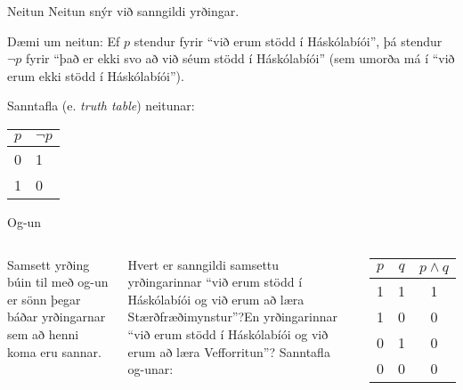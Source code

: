 \documentclass{beamer}
\begin{document}
\begin{frame}{Neitun}
Neitun snýr við sanngildi yrðingar.
\vspace{0.5cm}

Dæmi um neitun: Ef $p$ stendur fyrir ``við erum stödd í Háskólabíói'', þá stendur $\lnot p$ fyrir\pause{} ``það er ekki svo að við séum stödd í Háskólabíói'' (sem umorða má í ``við erum ekki stödd í Háskólabíói'').

\vspace*{0.5cm}
Sanntafla (e. \emph{truth table}) neitunar:

\begin{center}
\begin{tabular}{ll}
\toprule
$p$&$\lnot p$\\
\midrule
0&1\\
1&0\\
\bottomrule
\end{tabular}
\end{center}
\end{frame}

\begin{frame}{Og-un}
\begin{columns}
Samsett yrðing búin til með og-un er sönn þegar báðar yrðingarnar sem að henni koma eru sannar.

\vspace*{0.5cm}
Hvert er sanngildi samsettu yrðingarinnar ``við erum stödd í Háskólabíói og við erum að læra Stærðfræðimynstur''?\pause En yrðingarinnar ``við erum stödd í Háskólabíói og við erum að læra Vefforritun''?
Sanntafla og-unar:
\begin{center}
\begin{tabular}{ccc}
\toprule
$p$&$q$&$p \land q$ \\
\midrule
1&1&1\\
1&0&0\\
0&1&0\\
0&0&0\\
\bottomrule
\end{tabular}
\end{center}
\end{columns}
\end{frame}
\end{document}
